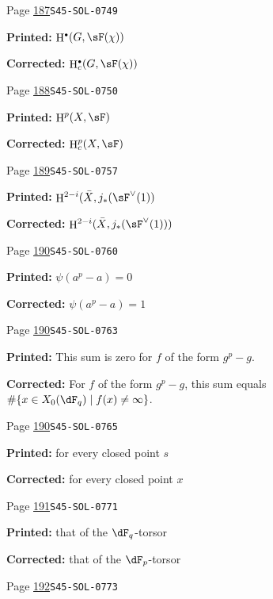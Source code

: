 \documentclass[oneside]{book}
\DeclareMathOperator{\h}{H}
\theoremstyle{sga-source}
\theoremstyle{sga-source-dash}
\theoremstyle{sga-source-dotdash}
\theoremstyle{sga-source-number-note-dash}
\theoremstyle{sga-source-note-number-dotdash}
\theoremstyle{sga-source-example-dotdash}
\theoremstyle{sga-source-inline-number}
\theoremstyle{sga-source-bare-number}
\theoremstyle{sga-source}
\let\oldbullet\bullet
\renewcommand{\bullet}{\textnormal{\tiny$\oldbullet$}}
\begin{document}
\begin{description}
\smallskip
\item[\hypertarget{apparatus:EN-0113}{113}] Page \hyperlink{printpage:en:187}{187}\quad\texttt{S45-SOL-0749}
\par\noindent\textbf{Printed:} \(\h^\bullet(G,\sF(\chi))\)
\par\noindent\textbf{Corrected:} \(\h_c^\bullet(G,\sF(\chi))\)
\smallskip
\item[\hypertarget{apparatus:EN-0114}{114}] Page \hyperlink{printpage:en:188}{188}\quad\texttt{S45-SOL-0750}
\par\noindent\textbf{Printed:} \(\h^p(X,\sF)\)
\par\noindent\textbf{Corrected:} \(\h_c^p(X,\sF)\)
\smallskip
\item[\hypertarget{apparatus:EN-0115}{115}] Page \hyperlink{printpage:en:189}{189}\quad\texttt{S45-SOL-0757}
\par\noindent\textbf{Printed:} \(\h^{2-i}(\bar X,j_\ast(\sF^\vee(1))\)
\par\noindent\textbf{Corrected:} \(\h^{2-i}(\bar X,j_\ast(\sF^\vee(1)))\)
\smallskip
\item[\hypertarget{apparatus:EN-0116}{116}] Page \hyperlink{printpage:en:190}{190}\quad\texttt{S45-SOL-0760}
\par\noindent\textbf{Printed:} \(\psi(a^p-a)=0\)
\par\noindent\textbf{Corrected:} \(\psi(a^p-a)=1\)
\smallskip
\item[\hypertarget{apparatus:EN-0117}{117}] Page \hyperlink{printpage:en:190}{190}\quad\texttt{S45-SOL-0763}
\par\noindent\textbf{Printed:} This sum is zero for $f$ of the form $g^p-g$.
\par\noindent\textbf{Corrected:} For $f$ of the form $g^p-g$, this sum equals $\#\{x\in X_0(\dF_q)\mid f(x)\ne\infty\}$.
\smallskip
\item[\hypertarget{apparatus:EN-0118}{118}] Page \hyperlink{printpage:en:190}{190}\quad\texttt{S45-SOL-0765}
\par\noindent\textbf{Printed:} for every closed point $s$
\par\noindent\textbf{Corrected:} for every closed point $x$
\smallskip
\item[\hypertarget{apparatus:EN-0119}{119}] Page \hyperlink{printpage:en:191}{191}\quad\texttt{S45-SOL-0771}
\par\noindent\textbf{Printed:} that of the $\dF_q$-torsor
\par\noindent\textbf{Corrected:} that of the $\dF_p$-torsor
\smallskip
\item[\hypertarget{apparatus:EN-0120}{120}] Page \hyperlink{printpage:en:192}{192}\quad\texttt{S45-SOL-0773}

\end{description}
\end{document}
